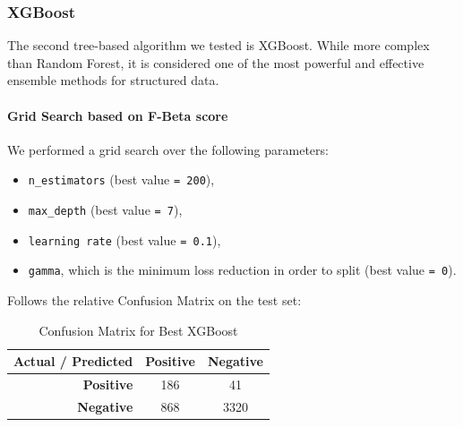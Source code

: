 \documentclass{article}
\begin{document}
\subsubsection{XGBoost}
The second tree-based algorithm we tested is XGBoost. While more complex than Random Forest, it is considered one of the most powerful and effective ensemble methods for structured data.
\paragraph{Grid Search based on F-Beta score}\mbox{}\newline
We performed a grid search over the following parameters:
\begin{itemize}
    \item \texttt{n\_estimators} (best value \texttt{= 200}),
    \item \texttt{max\_depth} (best value \texttt{= 7}),
    \item \texttt{learning rate} (best value \texttt{= 0.1}),
    \item \texttt{gamma}, which is the minimum loss reduction in order to split  (best value \texttt{= 0}).
\end{itemize}
Follows the relative Confusion Matrix on the test set:
\begin{table}[h!]
\centering
\caption{Confusion Matrix for Best XGBoost}
\label{tab:confusion_matrix}
\begin{tabular}{r|cc}
\toprule
\textbf{Actual / Predicted} & \textbf{Positive} & \textbf{Negative} \\
\midrule
\textbf{Positive} & 186 & 41 \\
\textbf{Negative} & 868 & 3320 \\
\bottomrule
\end{tabular}
\end{table}
\end{document}
